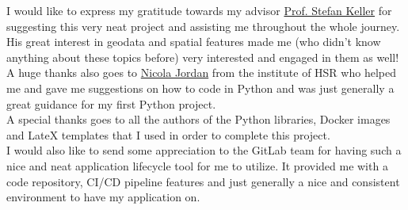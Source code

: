 I would like to express my gratitude towards my advisor \href{mailto:stefan.keller@hsr.ch}{Prof. Stefan Keller} for suggesting this very neat project and assisting me throughout the whole journey. His great interest in geodata and spatial features made me (who didn't know anything about these topics before) very interested and engaged in them as well!\\
\newline
A huge thanks also goes to \href{mailto:nicola.jordan@hsr.ch}{Nicola Jordan} from the institute of HSR who helped me and gave me suggestions on how to code in Python and was just generally a great guidance for my first Python project.\\
A special thanks goes to all the authors of the Python libraries, Docker images and LateX templates that I used in order to complete this project.\\
\newline
I would also like to send some appreciation to the GitLab team for having such a nice and neat application lifecycle tool for me to utilize. It provided me with a code repository, CI/CD pipeline features and just generally a nice and consistent environment to have my application on.